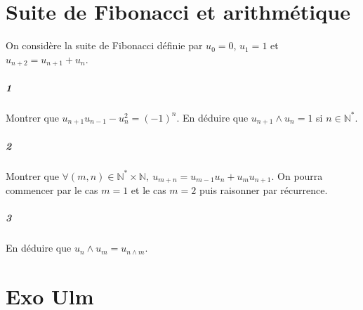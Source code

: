 \documentclass[10pt,a4paper]{article}
\begin{document}
\section{Suite de Fibonacci et arithmétique}
On considère la suite de Fibonacci définie par $u_0=0$, $u_1=1$ et $u_{n+2}=u_{n+1}+u_n$.
\subparagraph{1}Montrer que $u_{n+1}u_{n-1}-u_n^2=(-1)^n$. En déduire que $u_{n+1}  \wedge u_n=1$ si $n\in \mathbb{N}^*$.
\subparagraph{2}Montrer que $\forall (m,n)\in \mathbb{N}^* \times \mathbb{N}, \ u_{m+n}=u_{m-1}u_n+u_mu_{n+1}$. On pourra commencer par le cas $m=1$ et le cas $m=2$ puis raisonner par récurrence.
\subparagraph{3}En déduire que $u_n \wedge u_m=u_{n \wedge m}$.

\section{Exo Ulm }
\end{document}
